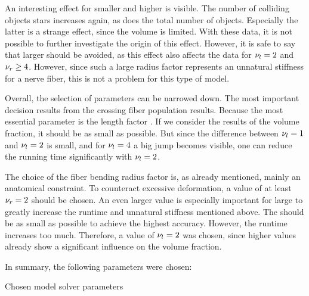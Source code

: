 An interesting effect for smaller \segLengthFactor{} and higher \segRadiusFactor{} is visible.
The number of colliding objects stars increases again, as does the total number of objects.
Especially the latter is a strange effect, since the volume is limited.
With these data, it is not possible to further investigate the origin of this effect.
However, it is safe to say that larger \segRadiusFactor{} should be avoided, as this effect also affects the data for $\textnormal{$\nu_{l}$} = 2$ and $\textnormal{$\nu_{r}$} \geq 4$.
However, since such a large radius factor represents an unnatural stiffness for a nerve fiber, this is not a problem for this type of model.
\par
%
Overall, the selection of parameters can be narrowed down.
The most important decision results from the crossing fiber population results.
Because the most essential parameter is the length factor \segLengthFactor{}.
If we consider the results of the volume fraction, it should be as small as possible.
But since the difference between $\textnormal{$\nu_{l}$}=\SI{1}{}$ and $\textnormal{$\nu_{l}$}=\SI{2}{}$ is small, and for $\textnormal{$\nu_{l}$}=\SI{4}{}$ a big jump becomes visible, one can reduce the running time significantly with $\textnormal{$\nu_{l}$}=\SI{2}{}$.
\par
%
The choice of the fiber bending radius factor \segRadiusFactor{} is, as already mentioned, mainly an anatomical constraint.
To counteract excessive deformation, a value of at least $\textnormal{$\nu_{r}$} = \SI{2}{}$ should be chosen.
An even larger value is especially important for large \segLengthFactor{} to greatly increase the runtime and unnatural stiffness mentioned above.
The \segLengthFactor{} should be as small as possible to achieve the highest accuracy.
However, the runtime increases too much.
Therefore, a value of $\textnormal{$\nu_{l}$} = \SI{2}{}$ was chosen, since higher values already show a significant influence on the volume fraction.
\par
%
In summary, the following parameters were chosen:
%
\begin{table}[H]
%
\centering
\caption{Chosen model solver parameters}
\label{tab:parameterSetup}
\end{table}
